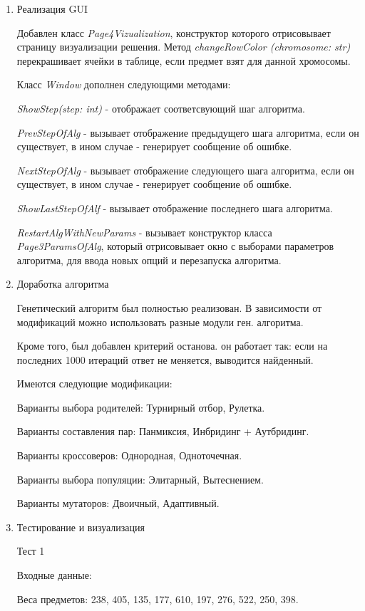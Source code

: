 \documentclass{article}
\begin{document}
\begin{enumerate}
\item Реализация GUI

Добавлен класс \textit{Page4Vizualization}, конструктор которого отрисовывает страницу визуализации решения. Метод \textit{changeRowColor (chromosome: str)} перекрашивает ячейки в таблице, если предмет взят для данной хромосомы.

Класс \textit{Window} дополнен следующими методами:

\textit{ShowStep(step: int)} - отображает соответсвующий шаг алгоритма.

\textit{PrevStepOfAlg} - вызывает отображение предыдущего шага алгоритма, если он существует, в ином случае - генерирует сообщение об ошибке.

\textit{NextStepOfAlg} - вызывает отображение следующего шага алгоритма, если он существует, в ином случае - генерирует сообщение об ошибке.

\textit{ShowLastStepOfAlf} - вызывает отображение последнего шага алгоритма.

\textit{RestartAlgWithNewParams} - вызывает конструктор класса \textit{Page3ParamsOfAlg}, который отрисовывает окно с выборами параметров алгоритма, для ввода новых опций и перезапуска алгоритма.

\item Доработка алгоритма

Генетический алгоритм был полностью реализован. В зависимости от модификаций можно использовать разные модули ген. алгоритма. 

Кроме того, был добавлен критерий останова. он работает так: если на последних 1000 итераций ответ не меняется, выводится найденный.

Имеются следующие модификации:

Варианты выбора родителей: Турнирный отбор, Рулетка.

Варианты составления пар: Панмиксия, Инбридинг + Аутбридинг.

Варианты кроссоверов: Однородная, Одноточечная.

Варианты выбора популяции: Элитарный, Вытеснением.

Варианты мутаторов: Двоичный, Адаптивный.

\item Тестирование и визуализация

Тест 1

Входные данные:

Веса предметов: 238, 405, 135, 177, 610, 197, 276, 522, 250, 398.


\end{enumerate}
\end{document}
